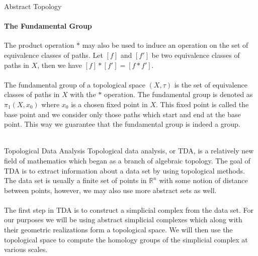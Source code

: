 \documentclass[pdf]{beamer}
\begin{document}
    \begin{frame}{Abstract Topology}
        \framesubtitle{The Fundamental Group}

        The product operation $*$ may also be used to induce an operation on the set of equivalence
        classes of paths. Let $[f]$ and $[f']$ be two equivalence classes of paths in $X$, then
        we have $[f] * [f'] = [f * f']$. \\~\\

        The {\color{red} fundamental group} of a topological space $(X, \tau)$ is the set of equivalence
        classes of paths in $X$ with the $*$ operation. The fundamental group is denoted as $\pi_1(X, x_0)$
        where $x_0$ is a chosen fixed point in $X$. This fixed point is called the {\color{red} base point}
        and we consider only those paths which start and end at the base point. This way we guarantee that the fundamental group is indeed a group. \\~\\
        
    \end{frame}

    \begin{frame}{Topological Data Analysis}
        Topological data analysis, or TDA, is a relatively new field of mathematics which began as a branch 
        of algebraic topology. The goal of TDA is to extract information about a data set by using topological
        methods. The data set is usually a finite set of points in $\mathbb{R}^n$ with some notion of distance
        between points, however, we may also use more abstract sets as well. \\~\\

        The first step in TDA is to construct a simplicial complex from the data set. For our purposes we will
        be using abstract simplicial complexes which along with their geometric realizations form a topological
        space. We will then use the topological space to compute the homology groups of the simplicial complex
        at various scales.
    \end{frame}
\end{document}
